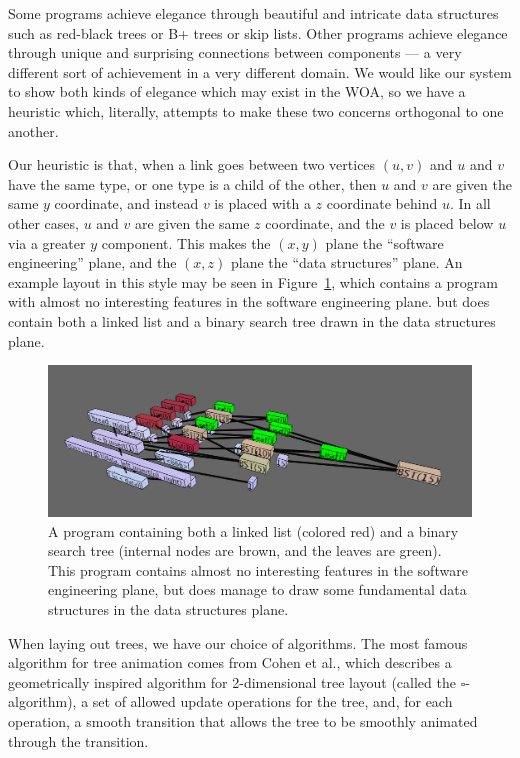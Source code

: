 \documentclass[11pt]{article}
\begin{document}
Some programs achieve elegance through beautiful and intricate data structures
such as red-black trees or B+ trees or skip lists.  Other programs achieve
elegance through unique and surprising connections between components --- a very
different sort of achievement in a very different domain.  We would like our
system to show both kinds of elegance which may exist in the WOA, so we have a
heuristic which, literally, attempts to make these two concerns orthogonal to
one another.

Our heuristic is that, when a link goes between two vertices $(u,v)$ and $u$ and $v$ have the same type, or one type is a child of the other, then $u$ and $v$ are given the same $y$ coordinate, and instead $v$ is placed with a $z$ coordinate behind $u$.  In all other cases, $u$ and $v$ are given the same $z$ coordinate, and the $v$ is placed below $u$ via a greater $y$ component.  This makes the $(x,y)$ plane the ``software engineering'' plane, and the $(x,z)$ plane the ``data structures'' plane.  An example layout in this style may be seen in Figure~\ref{fig:basic}, which contains a program with almost no interesting features in the software engineering plane. but does contain both a linked list and a binary search tree drawn in the data structures plane.  

\begin{figure}
\begin{center}
\includegraphics[width=5in]{figures/basic.png}
\end{center}
\caption{A program containing both a linked list (colored red) and a binary search tree (internal nodes are brown, and the leaves are green).  This program contains almost no interesting features in the software engineering plane, but does manage to draw some fundamental data structures in the data structures plane.}
\label{fig:basic}
\end{figure}

When laying out trees, we have our choice of algorithms.  The most famous algorithm for tree animation comes from Cohen et al.\cite{tamassia}, which describes a geometrically inspired algorithm for 2-dimensional tree layout (called the $\square$-algorithm), a set of allowed update operations for the tree, and, for each operation, a smooth transition that allows the tree to be smoothly animated through the transition.
\end{document}
